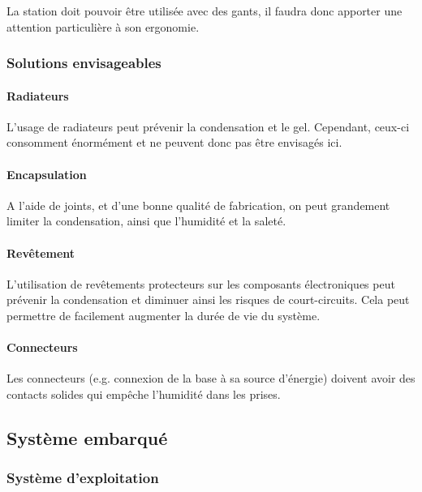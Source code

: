 La station doit pouvoir être utilisée avec des gants, il faudra donc apporter une attention particulière à son ergonomie.

\subsubsection{Solutions envisageables}

\paragraph{Radiateurs}

L'usage de radiateurs peut prévenir la condensation et le gel. Cependant, ceux-ci consomment énormément et ne peuvent donc pas être envisagés ici.

\paragraph{Encapsulation}

A l'aide de joints, et d'une bonne qualité de fabrication, on peut grandement limiter la condensation, ainsi que l'humidité et la saleté.

\paragraph{Revêtement}

L'utilisation de revêtements protecteurs sur les composants électroniques peut prévenir la condensation et diminuer ainsi les risques de court-circuits. Cela peut permettre de facilement augmenter la durée de vie du système.

\paragraph{Connecteurs}

Les connecteurs (e.g. connexion de la base à sa source d'énergie) doivent avoir des contacts solides qui empêche l’humidité dans les prises.




\subsection{Système embarqué}


\subsubsection{Système d'exploitation}

